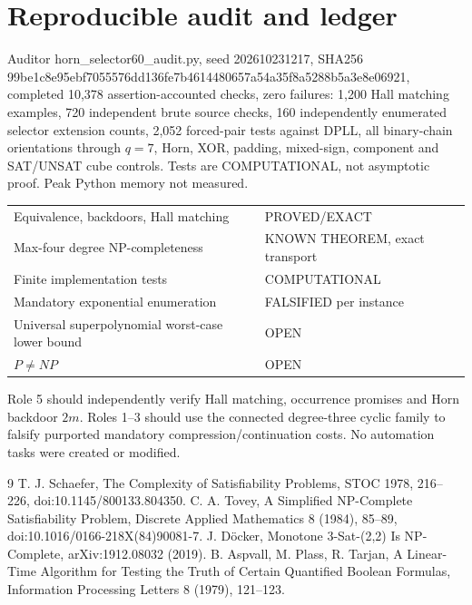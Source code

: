 \documentclass[11pt]{article}
\begin{document}
\section{Reproducible audit and ledger}
Auditor horn_selector60_audit.py, seed 202610231217, SHA256 99be1c8e95ebf7055576dd136fe7b4614480657a54a35f8a5288b5a3e8e06921, completed 10,378 assertion-accounted checks, zero failures: 1,200 Hall matching examples, 720 independent brute source checks, 160 independently enumerated selector extension counts, 2,052 forced-pair tests against DPLL, all binary-chain orientations through $q=7$, Horn, XOR, padding, mixed-sign, component and SAT/UNSAT cube controls. Tests are COMPUTATIONAL, not asymptotic proof. Peak Python memory not measured.
\begin{center}
\begin{tabular}{ll}
Equivalence, backdoors, Hall matching & PROVED/EXACT\\
Max-four degree NP-completeness & KNOWN THEOREM, exact transport\\
Finite implementation tests & COMPUTATIONAL\\
Mandatory exponential enumeration & FALSIFIED per instance\\
Universal superpolynomial worst-case lower bound & OPEN\\
$P\ne NP$ & OPEN
\end{tabular}
\end{center}
Role 5 should independently verify Hall matching, occurrence promises and Horn backdoor $2m$. Roles 1--3 should use the connected degree-three cyclic family to falsify purported mandatory compression/continuation costs. No automation tasks were created or modified.
\begin{thebibliography}{9}
 T. J. Schaefer, The Complexity of Satisfiability Problems, STOC 1978, 216--226, doi:10.1145/800133.804350.
 C. A. Tovey, A Simplified NP-Complete Satisfiability Problem, Discrete Applied Mathematics 8 (1984), 85--89, doi:10.1016/0166-218X(84)90081-7.
 J. D\"ocker, Monotone 3-Sat-(2,2) Is NP-Complete, arXiv:1912.08032 (2019).
 B. Aspvall, M. Plass, R. Tarjan, A Linear-Time Algorithm for Testing the Truth of Certain Quantified Boolean Formulas, Information Processing Letters 8 (1979), 121--123.
\end{thebibliography}
\end{document}
